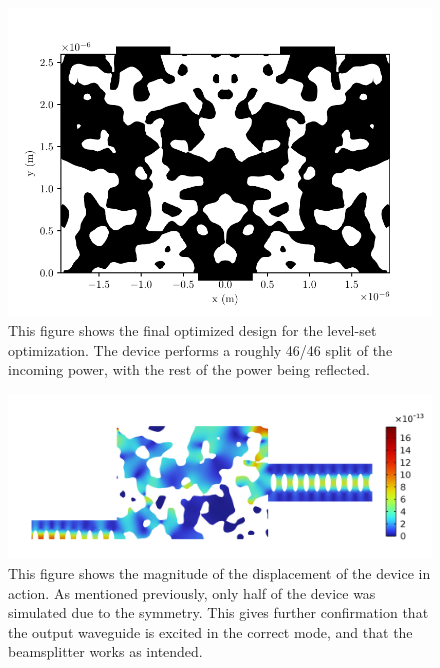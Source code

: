 \begin{figure}[htpb]
	\centering
	\includegraphics{chapters/results/bin_design_tmp_254.pdf}
	\caption{%
		This figure shows the final optimized design for the level-set
		optimization. The device performs a roughly 46/46 split of the incoming
		power, with the rest of the power being reflected.
	}%
	\label{fig:bin_design}
\end{figure}

\begin{figure}[htpb]
	\centering
	\includegraphics[width=\textwidth]{chapters/results/final_bs_disp.png}
	\caption{%
		This figure shows the magnitude of the displacement of the device in
		action. As mentioned previously, only half of the device was simulated
		due to the symmetry. This gives further confirmation that the output
		waveguide is excited in the correct mode, and that the beamsplitter
		works as intended.
	}%
	\label{fig:bin_design_disp}
\end{figure}
